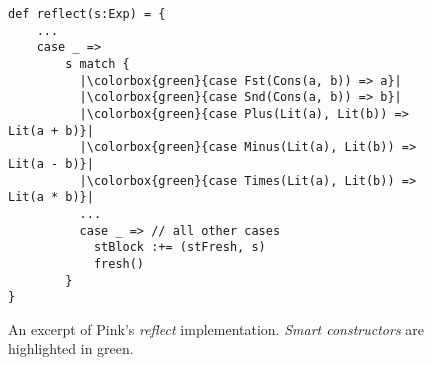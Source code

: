 \documentclass[a4paper,12pt,twoside,openright]{report}
\theoremstyle{definition}
\begin{document}
\begin{figure}[ht!]
    \centering
    \begin{verbatim}
def reflect(s:Exp) = {
    ...
    case _ =>
        s match {
          |\colorbox{green}{case Fst(Cons(a, b)) => a}|
          |\colorbox{green}{case Snd(Cons(a, b)) => b}|
          |\colorbox{green}{case Plus(Lit(a), Lit(b)) => Lit(a + b)}|
          |\colorbox{green}{case Minus(Lit(a), Lit(b)) => Lit(a - b)}|
          |\colorbox{green}{case Times(Lit(a), Lit(b)) => Lit(a * b)}|
          ...
          case _ => // all other cases
            stBlock :+= (stFresh, s)
            fresh()
        }
}
    \end{verbatim}
    \caption{An excerpt of Pink's \textit{reflect} implementation. \textit{Smart constructors} are highlighted in green.}
    \label{lst:mslang_interp}
\end{figure}

\end{document}

